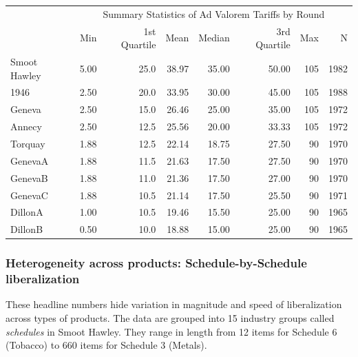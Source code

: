 \documentclass[
  12pt,
]{article}
\begin{document}
\begin{table}[!h]
\centering
\begin{tabular}[t]{lrrrrrrr}
\toprule
\multicolumn{1}{c}{\bgroup\fontsize{12}{14}\selectfont  \egroup{}} & \multicolumn{7}{c}{\bgroup\fontsize{12}{14}\selectfont Summary Statistics of Ad Valorem Tariffs by Round\egroup{}} \\
\cmidrule(l{3pt}r{3pt}){2-8}
  & Min & 1st Quartile & Mean & Median & 3rd Quartile & Max & N\\
\midrule
Smoot Hawley & 5.00 & 25.0 & 38.97 & 35.00 & 50.00 & 105 & 1982\\
1946 & 2.50 & 20.0 & 33.95 & 30.00 & 45.00 & 105 & 1988\\
Geneva & 2.50 & 15.0 & 26.46 & 25.00 & 35.00 & 105 & 1972\\
Annecy & 2.50 & 12.5 & 25.56 & 20.00 & 33.33 & 105 & 1972\\
Torquay & 1.88 & 12.5 & 22.14 & 18.75 & 27.50 & 90 & 1970\\
\addlinespace
GenevaA & 1.88 & 11.5 & 21.63 & 17.50 & 27.50 & 90 & 1970\\
GenevaB & 1.88 & 11.0 & 21.36 & 17.50 & 27.00 & 90 & 1970\\
GenevaC & 1.88 & 10.5 & 21.14 & 17.50 & 25.50 & 90 & 1971\\
DillonA & 1.00 & 10.5 & 19.46 & 15.50 & 25.00 & 90 & 1965\\
DillonB & 0.50 & 10.0 & 18.88 & 15.00 & 25.00 & 90 & 1965\\
\bottomrule
\end{tabular}
\end{table}

\hypertarget{heterogeneity-across-products-schedule-by-schedule-liberalization}{%
\subsubsection{Heterogeneity across products: Schedule-by-Schedule liberalization}\label{heterogeneity-across-products-schedule-by-schedule-liberalization}}

These headline numbers hide variation in magnitude and speed of liberalization across types of products. The data are grouped into 15 industry groups called \emph{schedules} in Smoot Hawley. They range in length from 12 items for Schedule 6 (Tobacco) to 660 items for Schedule 3 (Metals).
\end{document}
